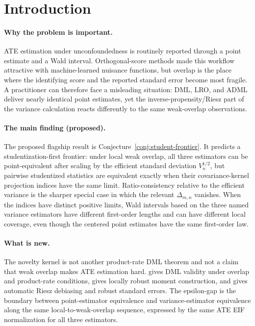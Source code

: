 \documentclass[11pt]{article}
\theoremstyle{definition}
\theoremstyle{plain}
\theoremstyle{remark}
\begin{document}
\section{Introduction}
\paragraph{Why the problem is important.}
ATE estimation under unconfoundedness is routinely reported through a point estimate and a Wald interval.  Orthogonal-score methods made this workflow attractive with machine-learned nuisance functions, but overlap is the place where the identifying score and the reported standard error become most fragile.  A practitioner can therefore face a misleading situation: DML, LRO, and ADML deliver nearly identical point estimates, yet the inverse-propensity/Riesz part of the variance calculation reacts differently to the same weak-overlap observations.

\paragraph{The main finding (proposed).}
The proposed flagship result is Conjecture~\ref{conj:student-frontier}.  It predicts a studentization-first frontier: under local weak overlap, all three estimators can be point-equivalent after scaling by the efficient standard deviation \(V_n^{1/2}\), but pairwise studentized statistics are equivalent exactly when their covariance-kernel projection indices have the same limit.  Ratio-consistency relative to the efficient variance is the sharper special case in which the relevant \(\Delta_{m,n}\) vanishes.  When the indices have distinct positive limits, Wald intervals based on the three named variance estimators have different first-order lengths and can have different local coverage, even though the centered point estimates have the same first-order law.

\paragraph{What is new.}
The novelty kernel is not another product-rate DML theorem and not a claim that weak overlap makes ATE estimation hard.  \citet{ChernozhukovEtAl2018DML} gives DML validity under overlap and product-rate conditions, \citet{ChernozhukovEscancianoIchimuraNeweyRobins2022LRO} gives locally robust moment construction, and \citet{ChernozhukovNeweySingh2022ADML} gives automatic Riesz debiasing and robust standard errors.  The epsilon-gap is the boundary between point-estimator equivalence and variance-estimator equivalence along the same local-to-weak-overlap sequence, expressed by the same ATE EIF normalization for all three estimators.
\end{document}
